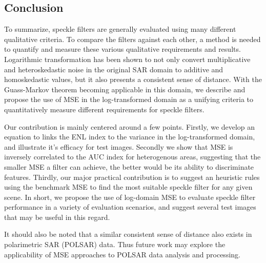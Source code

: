 \documentclass[journal]{IEEEtran}
\begin{document}
\subsection{Conclusion}

To summarize, speckle filters are generally evaluated using many different qualitative criteria.
To compare the filters against each other, a method is needed to quantify and measure these various qualitative requirements and results.
Logarithmic transformation has been shown to not only convert multiplicative and heteroskedastic noise in the original SAR domain to additive and homoskedastic values, but it also presents a consistent sense of distance.
With the Guass-Markov theorem becoming applicable in this domain, we describe and propose the use of MSE in the log-transformed domain as a unifying criteria to quantitatively measure different requirements for speckle filters.

Our contribution is mainly centered around a few points. 
Firstly, we develop an equation to links the ENL index to the variance in the log-transformed domain, and illustrate it's efficacy for test images.
Secondly we show that MSE is inversely correlated to the AUC index for heterogenous areas, suggesting that the smaller MSE a filter can achieve, the better would be its ability to discriminate features.
Thirdly, our major practical contribution is to suggest an heuristic rules using the benchmark MSE to find the most suitable speckle filter for any given scene. 
In short, we propose the use of log-domain MSE to evaluate speckle filter performance in a variety of evaluation scenarios, and suggest several test images that may be useful in this regard.

It should also be noted that a similar consistent sense of distance also exists in polarimetric SAR (POLSAR) data. 
Thus future work may explore the applicability of MSE approaches to POLSAR data analysis and processing.



\end{document}
